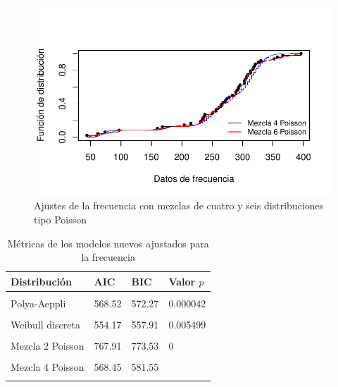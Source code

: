 \documentclass[
  letterpaper,
  onepage,
  openany]{scrreprt}
\begin{document}
\begin{figure}[H]

\caption{\label{fig-ajusteMezclasPoisson46}Ajustes de la frecuencia con
mezclas de cuatro y seis distribuciones tipo Poisson}

{\centering \includegraphics{./Bit4_files/figure-pdf/fig-ajusteMezclasPoisson46-1.pdf}

}

\end{figure}

\hypertarget{tbl-metricasNuevasFrecuencia}{}
\begin{table}
\caption{\label{tbl-metricasNuevasFrecuencia}Métricas de los modelos nuevos ajustados para la frecuencia }\tabularnewline

\centering
\begin{tabular}{l|l|l|l}
\hline
\textbf{Distribución} & \textbf{AIC} & \textbf{BIC} & \textbf{Valor $p$}\\
\hline
\cellcolor{gray!6}{Poisson-Gaussiana inversa} & \cellcolor{gray!6}{593.05} & \cellcolor{gray!6}{596.79} & \cellcolor{gray!6}{0}\\
\hline
Polya-Aeppli & 568.52 & 572.27 & 0.000042\\
\hline
\cellcolor{gray!6}{Delaporte} & \cellcolor{gray!6}{577.51} & \cellcolor{gray!6}{583.12} & \cellcolor{gray!6}{0}\\
\hline
Weibull discreta & 554.17 & 557.91 & 0.005499\\
\hline
\cellcolor{gray!6}{Gamma discreta} & \cellcolor{gray!6}{575.9} & \cellcolor{gray!6}{579.65} & \cellcolor{gray!6}{0.000002}\\
\hline
Mezcla 2 Poisson & 767.91 & 773.53 & 0\\
\hline
\cellcolor{gray!6}{Mezcla 3 Poisson} & \cellcolor{gray!6}{607.52} & \cellcolor{gray!6}{616.88} & \cellcolor{gray!6}{0.006487}\\
\hline
Mezcla 4 Poisson & 568.45 & 581.55 & \\
\hline
\cellcolor{gray!6}{Mezcla 6 Poisson} & \cellcolor{gray!6}{544.93} & \cellcolor{gray!6}{565.51} & \cellcolor{gray!6}{}\\
\hline
\end{tabular}
\end{table}
\end{document}
